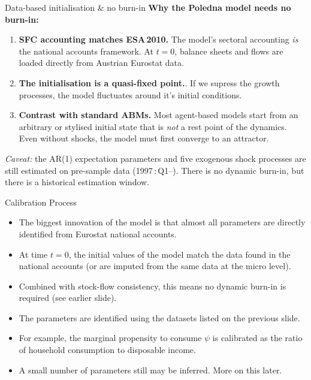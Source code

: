 \documentclass[9pt]{beamer}
\begin{document}
\begin{frame}{Data-based initialisation \& no burn-in}
    \textbf{Why the Poledna model needs no burn-in:}
    \vspace{0.6em}
    \begin{enumerate}
        \item[\textbf{1.}] \textbf{SFC accounting matches ESA\,2010.} The model's sectoral accounting \emph{is} the national accounts framework. At $t{=}0$, balance sheets and flows are loaded directly from Austrian Eurostat data.

        \vspace{0.3em}
        \item[\textbf{2.}] \textbf{The initialisation is a quasi-fixed point.}. If we supress the growth processes, the model fluctuates around it's initial conditions.

        \vspace{0.3em}
        \item[\textbf{3.}] \textbf{Contrast with standard ABMs.} Most agent-based models start from an arbitrary or stylised initial state that is \emph{not} a rest point of the dynamics. Even without shocks, the model must first converge to an attractor. 
    \end{enumerate}
    \vspace{0.4em}
    \footnotesize
    \emph{Caveat:} the AR(1) expectation parameters and five exogenous shock processes are still estimated on pre-sample data (1997\,:\,Q1--). There is no dynamic burn-in, but there is a historical estimation window.
\end{frame}

\begin{frame}{Calibration Process}
    \begin{itemize}
        \item The biggest innovation of the model is that almost all parameters are directly identified from Eurostat national accounts.
        \item At time $t = 0$, the initial values of the model match the data found in the national accounts (or are imputed from the same data at the micro level).
        \item Combined with stock-flow consistency, this means no dynamic burn-in is required (see earlier slide).
        \item The parameters are identified using the datasets listed on the previous slide.
        \item For example, the marginal propensity to consume $\psi$ is calibrated as the ratio of household consumption to disposable income.
        \item A small number of parameters still may be inferred. More on this later.
    \end{itemize}
\end{frame}
\end{document}
